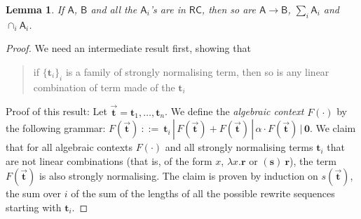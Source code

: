 \documentclass[colorlinks=true,linkcolor=black,urlcolor=black,citecolor=blue,submission,copyright,creativecommons]{eptcs}
\newtheorem{lemma}[theorem]{Lemma}
\newcommand{\ve}[1]{\mathrm{\textbf{#1}}}
\newcommand{\RC}{\mathsf{RC}}
\newcommand{\bcal}[1]{\mathsf{#1}}
\begin{document}
\begin{lemma}\label{lem:RCop}
  If $\bcal{A}$, $\bcal{B}$ and all the $\bcal{A}_i$'s are in $\RC$,
  then so are $\bcal{A}\to\bcal{B}$, $\sum_i\bcal{A}_i$ and
  $\cap_i\bcal{A}_i$.
\end{lemma}
\begin{proof}
We need an intermediate result first, showing that
\begin{quote}
if $\{\ve t_i\}_i$ is a family of strongly normalising term, then so is any linear combination of term made of the $\ve t_i$
\end{quote}
Proof of this result: Let $\vec{\ve t}=\ve t_1,\dots,\ve t_n$.  We define the
  {\em algebraic context} $F(\cdot)$ by the following grammar: $F(\vec{\ve t})~::=~\ve t_i\,|\, F(\vec{\ve t}) + F(\vec{\ve t})\,|\,\alpha\cdot F(\vec{\ve t}) \,|\, {\ve 0}.$
We claim that for all algebraic contexts $F(\cdot)$ and all strongly
  normalising terms ${\ve t}_i$ that are not linear combinations (that
  is, of the form $x$, $\lambda x.\ve r$ or $(\ve s)~\ve r$), the term
  $F(\vec{\ve t})$ is also strongly normalising.
The claim is proven by induction on $s(\vec{\ve t})$, the sum over
  $i$ of the sum of the lengths of all the possible rewrite sequences
  starting with $\ve t_i$.


\end{proof}
\end{document}
